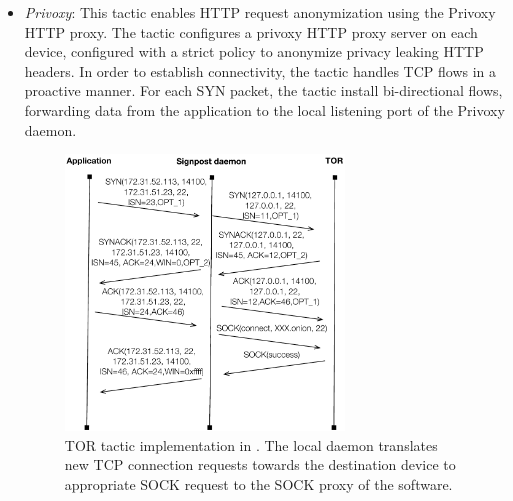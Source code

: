 \begin{itemize}
  \item \emph{Privoxy}: This tactic enables HTTP request anonymization using the
    Privoxy~\cite{privoxy} HTTP proxy. The tactic configures a privoxy HTTP
    proxy server on each device, configured with a strict policy to anonymize
    privacy leaking HTTP headers.  In order to establish connectivity, the
    tactic handles TCP flows in a proactive manner.  For each SYN packet, the
    tactic install bi-directional flows, forwarding data from the application to
    the local listening port of the Privoxy daemon.


\begin{figure}
  \begin{center}
	\includegraphics[width=0.7\textwidth]{tor-example}
  \end{center}
  \caption[TOR tactic implementation in \signpost]{TOR tactic implementation in
    \signpost. The local \signpost daemon translates new TCP connection requests
    towards the destination device to appropriate SOCK request to the SOCK proxy
    of the software.}
  \label{fig:signpost:tor-example}
\end{figure}
  

\end{itemize}

